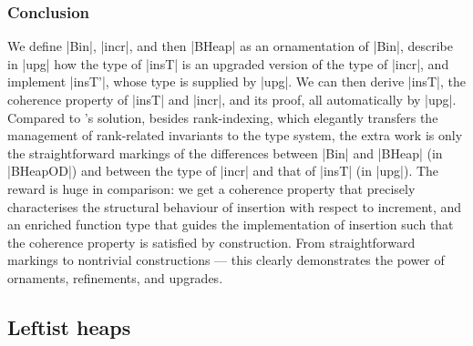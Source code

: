 \subsubsection{Conclusion}

We define |Bin|, |incr|, and then |BHeap| as an ornamentation of |Bin|, describe in |upg| how the type of |insT| is an upgraded version of the type of |incr|, and implement |insT'|, whose type is supplied by |upg|.
We can then derive |insT|, the coherence property of |insT| and |incr|, and its proof, all automatically by |upg|.
Compared to \citeauthor{Okasaki-data-structures}'s solution, besides rank-indexing, which elegantly transfers the management of rank-related invariants to the type system, the extra work is only the straightforward markings of the differences between |Bin| and |BHeap| (in |BHeapOD|) and between the type of |incr| and that of |insT| (in |upg|).
The reward is huge in comparison: we get a coherence property that precisely characterises the structural behaviour of insertion with respect to increment, and an enriched function type that guides the implementation of insertion such that the coherence property is satisfied by construction.
From straightforward markings to nontrivial constructions --- this clearly demonstrates the power of ornaments, refinements, and upgrades.

\subsection{Leftist heaps}


